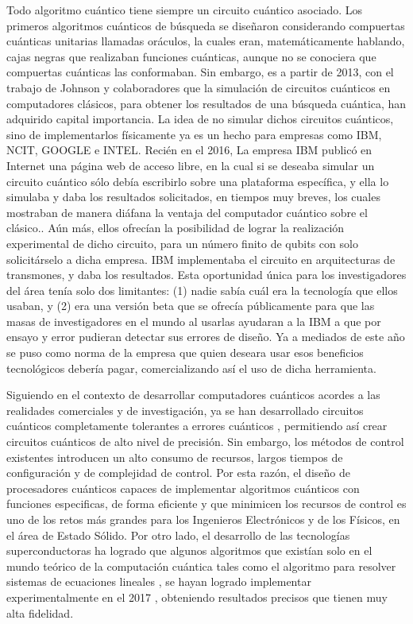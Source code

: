 Todo algoritmo cuántico tiene siempre un circuito cuántico asociado. Los primeros algoritmos cuánticos de búsqueda se diseñaron considerando compuertas cuánticas unitarias llamadas oráculos, la cuales eran, matemáticamente hablando, cajas negras que realizaban funciones cuánticas, aunque no se conociera que compuertas cuánticas las conformaban. Sin embargo, es a partir de 2013, con el trabajo de Johnson y colaboradores \cite{Johnson_2013} que la simulación de circuitos cuánticos en computadores clásicos, para obtener los resultados de una búsqueda cuántica, han adquirido capital importancia. La idea de no simular dichos circuitos cuánticos, sino de implementarlos físicamente ya es un hecho para empresas como IBM, NCIT, GOOGLE e INTEL. Recién en el 2016, La empresa IBM publicó en Internet una página web de acceso libre, en la cual si se deseaba simular un circuito cuántico sólo debía escribirlo sobre una plataforma específica, y ella lo simulaba y daba los resultados solicitados, en tiempos muy breves, los cuales mostraban de manera diáfana la ventaja del computador cuántico sobre el clásico.. Aún más, ellos ofrecían la posibilidad de lograr la realización experimental de dicho circuito, para un número finito de qubits con solo solicitárselo a dicha empresa. IBM implementaba el circuito en arquitecturas de transmones, y daba los resultados. Esta oportunidad única para los investigadores del área tenía solo dos limitantes: (1) nadie sabía cuál era la tecnología que ellos usaban, y (2) era una versión beta que se ofrecía públicamente para que las masas de investigadores en el mundo al usarlas ayudaran a la IBM a que por ensayo y error pudieran detectar sus errores de diseño. Ya a mediados de este año se puso como norma de la empresa que quien deseara usar esos beneficios tecnológicos debería pagar, comercializando así el uso de dicha herramienta.

Siguiendo en el contexto de desarrollar computadores cuánticos acordes a las realidades comerciales y de investigación, ya se han desarrollado circuitos cuánticos completamente tolerantes a errores cuánticos \cite{Paler_2017}, permitiendo así crear circuitos cuánticos de alto nivel de precisión. Sin embargo, los métodos de control existentes introducen un alto consumo de recursos, largos tiempos de configuración y de complejidad de control. Por esta razón, el diseño de procesadores cuánticos capaces de implementar algoritmos cuánticos con funciones especificas, de forma eficiente y que minimicen los recursos de control es uno de los retos más grandes para los Ingenieros Electrónicos y de los Físicos, en el área de Estado Sólido.  Por otro lado, el desarrollo de las tecnologías superconductoras ha logrado que algunos algoritmos que existían solo en el mundo teórico de la computación cuántica tales como el algoritmo para resolver sistemas de ecuaciones lineales \cite{Cao_2012}, se hayan logrado implementar experimentalmente en el 2017 \cite{Zheng_2017}, obteniendo resultados precisos que tienen muy alta fidelidad.

